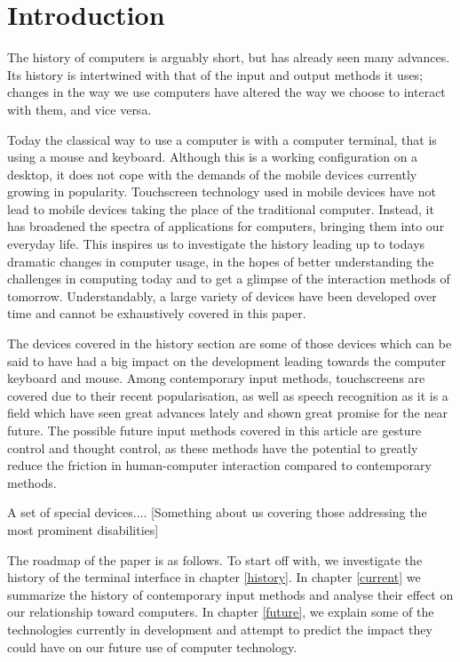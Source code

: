 
\section{Introduction}

The history of computers is arguably short, but has already seen many advances. Its history is intertwined with that of the input and output methods it uses; changes in the way we use computers have altered the way we choose to interact with them, and vice versa. 

Today the classical way to use a computer is with a computer terminal, that is using a mouse and keyboard. Although this is a working configuration on a desktop, it does not cope with the demands of the mobile devices currently growing in popularity. Touchscreen technology used in mobile devices have not lead to mobile devices taking the place of the traditional computer. Instead, it has broadened the spectra of applications for computers, bringing them into our everyday life. This inspires us to investigate the history leading up to todays dramatic changes in computer usage, in the hopes of better understanding the challenges in computing today and to get a glimpse of the interaction methods of tomorrow. Understandably, a large variety of devices have been developed over time and cannot be exhaustively covered in this paper.

The devices covered in the history section are some of those devices which can be said to have had a big impact on the development leading towards the computer keyboard and mouse. Among contemporary input methods, touchscreens are covered due to their recent popularisation, as well as speech recognition as it is a field which have seen great advances lately and shown great promise for the near future. The possible future input methods covered in this article are gesture control and thought control, as these methods have the potential to greatly reduce the friction in human-computer interaction compared to contemporary methods.

A set of special devices.... [Something about us covering those addressing the most prominent disabilities]

The roadmap of the paper is as follows. To start off with, we investigate the history of the terminal interface in chapter \ref{history}. In chapter \ref{current} we summarize the history of contemporary input methods and analyse their effect on our relationship toward computers. In chapter \ref{future}, we explain some of the technologies currently in development and attempt to predict the impact they could have on our future use of computer technology.
